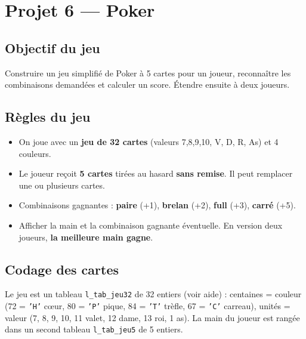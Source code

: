 \section{Projet 6 — Poker}
\setcounter{UPSTInumeroCahier des charges}{0}

\subsection*{Objectif du jeu}
Construire un jeu simplifié de Poker à 5 cartes pour un joueur, reconnaître les combinaisons demandées et calculer un score. Étendre ensuite à deux joueurs.

\subsection*{Règles du jeu}
\begin{itemize}
  \item On joue avec un \textbf{jeu de 32 cartes} (valeurs 7,8,9,10, V, D, R, As) et 4 couleurs.
  \item Le joueur reçoit \textbf{5 cartes} tirées au hasard \textbf{sans remise}. Il peut remplacer une ou plusieurs cartes.
  \item Combinaisons gagnantes : \textbf{paire} (+1), \textbf{brelan} (+2), \textbf{full} (+3), \textbf{carré} (+5).
  \item Afficher la main et la combinaison gagnante éventuelle. En version deux joueurs, \textbf{la meilleure main gagne}.
\end{itemize}

\subsection*{Codage des cartes}
Le jeu est un tableau \texttt{l\_tab\_jeu32} de 32 entiers (voir aide) : centaines = couleur (72 = \texttt{'H'} c\oe{}ur, 80 = \texttt{'P'} pique, 84 = \texttt{'T'} trèfle, 67 = \texttt{'C'} carreau), unités = valeur (7, 8, 9, 10, 11 valet, 12 dame, 13 roi, 1 as). La main du joueur est rangée dans un second tableau \texttt{l\_tab\_jeu5} de 5 entiers.


